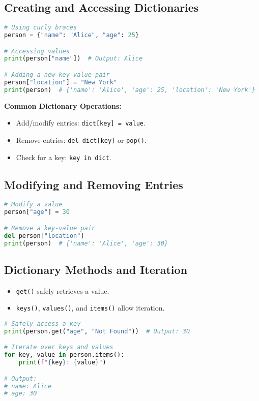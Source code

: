 \documentclass{article}
\begin{document}
\subsection{Creating and Accessing Dictionaries}
\begin{lstlisting}[language=Python]
# Using curly braces
person = {"name": "Alice", "age": 25}

# Accessing values
print(person["name"])  # Output: Alice

# Adding a new key-value pair
person["location"] = "New York"
print(person)  # {'name': 'Alice', 'age': 25, 'location': 'New York'}
\end{lstlisting}
\noindent\textbf{Common Dictionary Operations:}
\begin{itemize}
    \item Add/modify entries: \texttt{dict[key] = value}.
    \item Remove entries: \texttt{del dict[key]} or \texttt{pop()}.
    \item Check for a key: \texttt{key in dict}.
\end{itemize}
\subsection{Modifying and Removing Entries}
\begin{lstlisting}[language=Python]
# Modify a value
person["age"] = 30

# Remove a key-value pair
del person["location"]
print(person)  # {'name': 'Alice', 'age': 30}
\end{lstlisting}

\subsection{Dictionary Methods and Iteration}
\begin{itemize}
    \item \texttt{get()} safely retrieves a value.
    \item \texttt{keys()}, \texttt{values()}, and \texttt{items()} allow iteration.
\end{itemize}
\begin{lstlisting}[language=Python]
# Safely access a key
print(person.get("age", "Not Found"))  # Output: 30

# Iterate over keys and values
for key, value in person.items():
    print(f"{key}: {value}")

# Output:
# name: Alice
# age: 30
\end{lstlisting}
\end{document}
